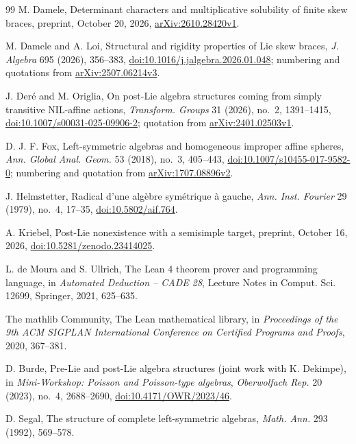 \documentclass[11pt]{article}
\theoremstyle{definition}
\theoremstyle{remark}
\begin{document}
\begin{thebibliography}{99}
 M. Damele, Determinant characters and multiplicative
solubility of finite skew braces, preprint, October 20, 2026,
\href{https://arxiv.org/abs/2610.28420v1}{arXiv:2610.28420v1}.

 M. Damele and A. Loi, Structural and rigidity properties of
Lie skew braces, \emph{J. Algebra} 695 (2026), 356--383,
\href{https://doi.org/10.1016/j.jalgebra.2026.01.048}{doi:10.1016/j.jalgebra.2026.01.048};
numbering and quotations from
\href{https://arxiv.org/abs/2507.06214v3}{arXiv:2507.06214v3}.

 J. Der\'e and M. Origlia, On post-Lie algebra structures
coming from simply transitive NIL-affine actions, \emph{Transform. Groups}
31 (2026), no.~2, 1391--1415,
\href{https://doi.org/10.1007/s00031-025-09906-2}{doi:10.1007/s00031-025-09906-2};
quotation from \href{https://arxiv.org/abs/2401.02503v1}{arXiv:2401.02503v1}.

 D. J. F. Fox, Left-symmetric algebras and homogeneous
improper affine spheres, \emph{Ann. Global Anal. Geom.} 53 (2018), no.~3,
405--443,
\href{https://doi.org/10.1007/s10455-017-9582-0}{doi:10.1007/s10455-017-9582-0};
numbering and quotation from
\href{https://arxiv.org/abs/1707.08896v2}{arXiv:1707.08896v2}.

 J. Helmstetter, Radical d'une alg\`ebre sym\'etrique \`a
gauche, \emph{Ann. Inst. Fourier} 29 (1979), no.~4, 17--35,
\href{https://doi.org/10.5802/aif.764}{doi:10.5802/aif.764}.

 A. Kriebel, Post-Lie nonexistence with a semisimple target,
preprint, October 16, 2026,
\href{https://doi.org/10.5281/zenodo.23414025}{doi:10.5281/zenodo.23414025}.

 L. de Moura and S. Ullrich, The Lean 4 theorem prover and
programming language, in \emph{Automated Deduction -- CADE 28}, Lecture
Notes in Comput. Sci. 12699, Springer, 2021, 625--635.

 The mathlib Community, The Lean mathematical library, in
\emph{Proceedings of the 9th ACM SIGPLAN International Conference on
Certified Programs and Proofs}, 2020, 367--381.

 D. Burde, Pre-Lie and post-Lie algebra structures (joint
work with K. Dekimpe), in \emph{Mini-Workshop: Poisson and Poisson-type
algebras}, \emph{Oberwolfach Rep.} 20 (2023), no.~4, 2688--2690,
\href{https://doi.org/10.4171/OWR/2023/46}{doi:10.4171/OWR/2023/46}.

 D. Segal, The structure of complete left-symmetric algebras,
\emph{Math. Ann.} 293 (1992), 569--578.


\end{thebibliography}
\end{document}
